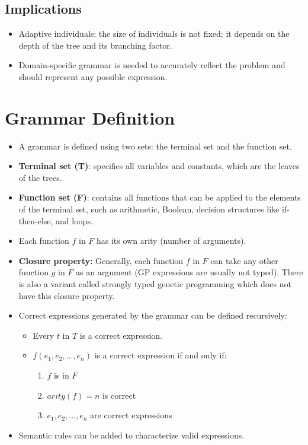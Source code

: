 \subsection*{Implications}
\begin{itemize}
    \item Adaptive individuals: the size of individuals is not fixed; it depends on the depth of the tree and its branching factor.
    \item Domain-specific grammar is needed to accurately reflect the problem and should represent any possible expression.
\end{itemize}

\section{Grammar Definition}
\begin{itemize}
    \item  A grammar is defined using two sets: the terminal set and the function set.
   \item \textbf{Terminal set (T)}: specifies all variables and constants, which are the leaves of the trees.
    \item \textbf{Function set (F)}: contains all functions that can be applied to the elements of the terminal set, such as arithmetic, Boolean, decision structures like if-then-else, and loops.
    \item Each function $f$ in $F$ has its own arity (number of arguments).
   \item \textbf{Closure property:} Generally, each function $f$ in $F$ can take any other function $g$ in $F$ as an argument (GP expressions are usually not typed). There is also a variant called strongly typed genetic programming which does not have this closure property.
    \item  Correct expressions generated by the grammar can be defined recursively:
    \begin{itemize}
        \item Every $t$ in $T$ is a correct expression.
        \item $f(e_1, e_2, ..., e_n)$ is a correct expression if and only if:
        \begin{enumerate}
            \item $f$ is in $F$
            \item $arity(f) = n$ is correct
            \item $e_1, e_2, ..., e_n$ are correct expressions
         \end{enumerate}
    \end{itemize}
    \item Semantic rules can be added to characterize valid expressions.
\end{itemize}


